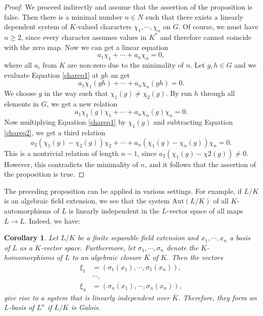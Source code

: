 \documentclass[12pt]{report}
\newtheorem{cor}[thm]{Corollary}
\theoremstyle{definition}
\def\Aut{\text{Aut}}
\begin{document}
\begin{proof}
    We proceed indirectly and assume that the assertion of the proposition is false. Then there is a minimal number $n \in N$ such that there exists a linearly dependent system of $K$-valued characters $\chi_1, \cdots , \chi_n$ on $G$. Of course, we must have $n \geq 2$, since every character assumes values in $K^*$ and therefore cannot coincide with the zero map. Now we can get a linear equation
    \begin{equation}\label{chareq1}
        a_1\chi_1+\cdots + a_n\chi_n = 0,
    \end{equation}
    where all $a_i$ from $K$ are non-zero due to the minimality of $n$. Let $g,h\in G$ and  we evaluate Equation \ref{chareq1} at $gh$ an get 
    \begin{equation*}
        a_1\chi_1(gh)+\cdots + a_n\chi_n(gh) = 0.
    \end{equation*}
    We choose $g$ in the way such that $\chi_1(g)\not=\chi_2(g)$. By run $h$ through all elements in $G$, we get a new relation 
    \begin{equation}\label{chareq2}
        a_1\chi_1(g)\chi_1+\cdots + a_n\chi_n(g)\chi_n = 0.
    \end{equation}
    Now multiplying Equation \ref{chareq1} by $\chi_1(g)$ and subtracting Equation \ref{chareq2}, we get a third relation   
    \begin{equation*}
        a_2(\chi_1(g)-\chi_2(g))\chi_2 +\cdots + a_n(\chi_1(g)-\chi_n(g))\chi_n = 0.
    \end{equation*}
    This is a nontrivial relation of length $n-1$, since $a_2(\chi_1(g)-\chi2(g)) \not= 0$. However, this contradicts the minimality of $n$, and it follows that the assertion of the proposition is true.
\end{proof}


The preceding proposition can be applied in various settings. For example, if $L/K$ is an algebraic field extension, we see that the system $\Aut(L/K)$ of all $K$-automorphisms of $L$ is linearly independent in the $L$-vector space of all maps $L \to L$. Indeed, we have:

\begin{cor}\label{charcor}
    Let $L/K$ be a finite separable field extension and $x_1, \cdots , x_n$ a basis of $L$ as a $K$-vector space. Furthermore, let $\sigma_1, \cdots , \sigma_n$ denote the $K$-homomorphisms of $L$ to an algebraic closure $\overline{K}$ of $K$. Then the vectors
    \begin{align*}
        \xi_1 &= (\sigma_1(x_1),\cdots,\sigma_1(x_n)),\\
        &\cdots,\\
        \xi_n &= (\sigma_n(x_1),\cdots,\sigma_n(x_n)),
    \end{align*}
    give rise to a system that is linearly independent over $\overline{K}$. Therefore, they form an $L$-basis of $L^n$ if $L/K$ is Galois.
\end{cor}
\end{document}
